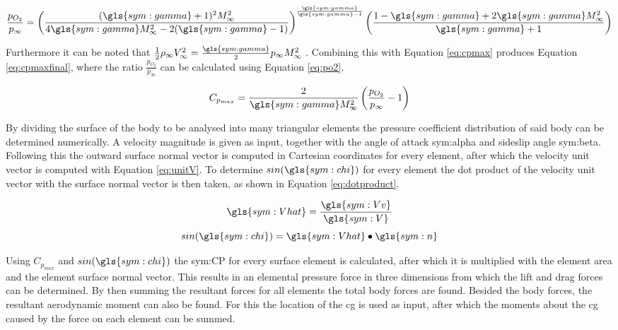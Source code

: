 \begin{equation}
\frac{p_{O_{2}}}{p_{\infty}}=\left(\frac{(\gls{sym:gamma}+1)^{2}M_{\infty}^{2}}{4\gls{sym:gamma} M_{\infty}^{2}-2(\gls{sym:gamma}-1)}\right)^{\frac{\gls{sym:gamma}}{\gls{sym:gamma}-1}}\left(\frac{1-\gls{sym:gamma}+2\gls{sym:gamma} M_{\infty}^{2}}{\gls{sym:gamma}+1}\right)
\label{eq:po2}
\end{equation}

Furthermore it can be noted that $\frac{1}{2}\rho_{\infty}V_{\infty}^{2}=\frac{\gls{sym:gamma}}{2}p_{\infty}M_{\infty}^{2}$ \cite{AndersonJr.2007}. Combining this with Equation \ref{eq:cpmax} produces Equation \ref{eq:cpmaxfinal}, where the ratio $\frac{p_{O_{2}}}{p_{\infty}}$ can be calculated using Equation \ref{eq:po2}.

\begin{equation}
C_{p_{max}}=\frac{2}{\gls{sym:gamma} M_{\infty}^{2}}\left(\frac{p_{O_{2}}}{p_{\infty}}-1\right)
\label{eq:cpmaxfinal}
\end{equation}

By dividing the surface of the body to be analysed into many triangular elements the pressure coefficient distribution of said body can be determined numerically. A velocity magnitude is given as input, together with the angle of attack \gls{sym:alpha} and sideslip angle \gls{sym:beta}. Following this the outward surface normal vector is computed in Cartesian coordinates for every element, after which the velocity unit vector is computed with Equation \ref{eq:unitV}. To determine $sin(\gls{sym:chi})$ for every element the dot product of the velocity unit vector with the surface normal vector is then taken, as shown in Equation \ref{eq:dotproduct}.
\begin{multicols}{2}
\begin{equation}
\gls{sym:Vhat}=\frac{\gls{sym:Vv}}{\gls{sym:V}}
\label{eq:unitV}
\end{equation} \break
\begin{equation}
sin(\gls{sym:chi})=\gls{sym:Vhat} \bullet \gls{sym:n}
\label{eq:dotproduct}
\end{equation}
\end{multicols}
Using $C_{p_{max}}$ and $sin(\gls{sym:chi})$ the \gls{sym:CP} for every surface element is calculated, after which it is multiplied with the element area and the element surface normal vector. This results in an elemental pressure force in three dimensions from which the lift and drag forces can be determined. By then summing the resultant forces for all elements the total body forces are found. Besided the body forces, the resultant aerodynamic moment can also be found. For this the location of the \acrfull{cg} is used as input, after which the moments about the \gls{cg} caused by the force on each element can be summed. 

